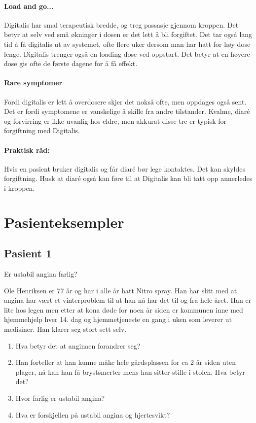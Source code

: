 				\paragraph{Load and go...\\}
					Digitalis har smal terapeutisk bredde, og treg passasje gjennom kroppen. Det betyr at selv ved små økninger i dosen er det lett å bli forgiftet. Det tar også lang tid å få digitalis ut av systemet, ofte flere uker dersom man har hatt for høy dose lenge. Digitalis trenger også en loading dose ved oppstart. Det betyr at en høyere dose gis ofte de første dagene for å få effekt.
				\paragraph{Rare symptomer\\}
					Fordi digitalis er lett å overdosere skjer det nokså ofte, men oppdages også sent. Det er fordi symptomene er vanskelige å skille fra andre tilstander. Kvalme, diaré og forvirring er ikke uvanlig hos eldre, men akkurat disse tre er typisk for forgiftning med Digitalis.
				\paragraph{Praktisk råd:\\}
					Hvis en pasient bruker digitalis og får diaré bør lege kontaktes. Det kan skyldes forgiftning. Husk at diaré også kan føre til at Digitalis kan bli tatt opp annerledes i kroppen.
		\section{Pasienteksempler}
			\subsection{Pasient 1}
				Er ustabil angina farlig?\par
				Ole Henriksen er 77 år og har i alle år hatt Nitro spray. Han har slitt med at angina har vært et vinterproblem til at han nå har det til og fra hele året. Han er lite hos legen men etter at kona døde for noen år siden er kommunen inne med hjemmehjelp hver 14. dag og hjemmetjeneste en gang i uken som leverer ut medisiner. Han klarer seg stort sett selv.\begin{enumerate}
					\item Hva betyr det at anginaen forandrer seg?
					\item Han forteller at han kunne måke hele gårdsplassen for ca 2 år siden uten plager, nå kan han få brystsmerter mens han sitter stille i stolen. Hva betyr det?
					\item Hvor farlig er ustabil angina?
					\item Hva er forskjellen på ustabil angina og hjertesvikt?
				\end{enumerate}

